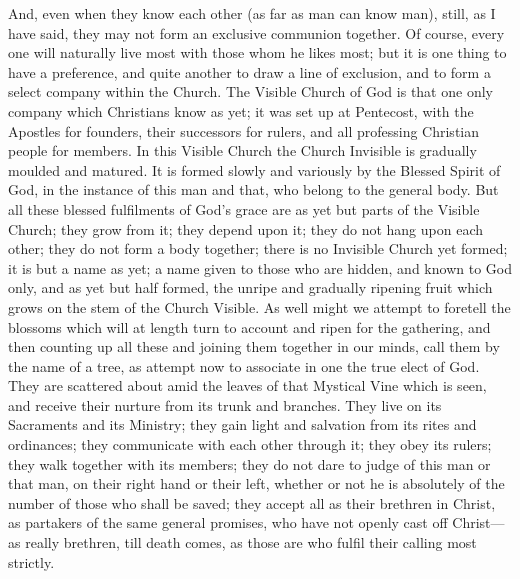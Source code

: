 And, even when they know each other (as far as man can know man),
still, as I have said, they may not form an exclusive communion
together. Of course, every one will naturally live most with those
whom he likes most; but it is one thing to have a preference, and
quite another to draw a line of exclusion, and to form a select
company within the Church. The Visible Church of God is that one only
company which Christians know as yet; it was set up at Pentecost, with
the Apostles for founders, their successors for rulers, and all
professing Christian people for members. In this Visible Church the
Church Invisible is gradually moulded and matured. It is formed slowly
and variously by the Blessed Spirit of God, in the instance of this
man and that, who belong to the general body. But all these blessed
fulfilments of God's grace are as yet but parts of the Visible
Church; they grow from it; they depend upon it; they do not hang upon
each other; they do not form a body together; there is no Invisible
Church yet formed; it is but a name as yet; a name given to those who
are hidden, and known to God only, and as yet but half formed, the
unripe and gradually ripening fruit which grows on the stem of the
Church Visible. As well might we attempt to foretell the blossoms
which will at length turn to account and ripen for the gathering, and
then counting up all these and joining them together in our minds,
call them by the name of a tree, as attempt now to associate in one
the true elect of God. They are scattered about amid the leaves of
that Mystical Vine which is seen, and receive their nurture from its
trunk and branches. They live on its Sacraments and its Ministry; they
gain light and salvation from its rites and ordinances; they
communicate with each other through it; they obey its rulers; they
walk together with its members; they do not dare to judge of this man
or that man, on their right hand or their left, whether or not he is
absolutely of the number of those who shall be saved; they accept all
as their brethren in Christ, as partakers of the same general
promises, who have not openly cast off Christ—as really brethren,
till death comes, as those are who fulfil their calling most strictly.

